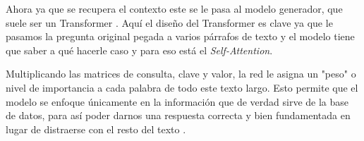 Ahora ya que se recupera el contexto este se le pasa al modelo generador, que suele ser un Transformer \cite{cite41}. Aquí el diseño del Transformer es clave ya que le pasamos la pregunta original pegada a varios párrafos de texto y el modelo tiene que saber a qué hacerle caso y para eso está el \textit{Self-Attention}.

Multiplicando las matrices de consulta, clave y valor, la red le asigna un "peso" o nivel de importancia a cada palabra de todo este texto largo. Esto permite que el modelo se enfoque únicamente en la información que de verdad sirve de la base de datos, para así poder darnos una respuesta correcta y bien fundamentada en lugar de distraerse con el resto del texto \cite{cite42}.
